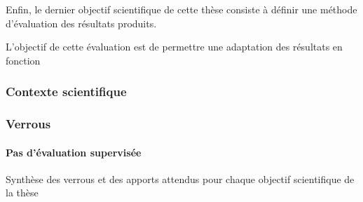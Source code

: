 Enfin, le dernier objectif scientifique de cette thèse consiste à
définir une méthode d'évaluation des résultats produits.

L'objectif de cette évaluation est de permettre une adaptation des
résultats en fonction 

\subsubsection{Contexte scientifique}

\subsubsection{Verrous}

\paragraph{Pas d'évaluation supervisée}


\begin{table}[h]
  \centering
  
  \caption{Synthèse des verrous et des apports attendus pour chaque
    objectif scientifique de la thèse}
  \label{tab:synthese_objectifs}
\end{table}

